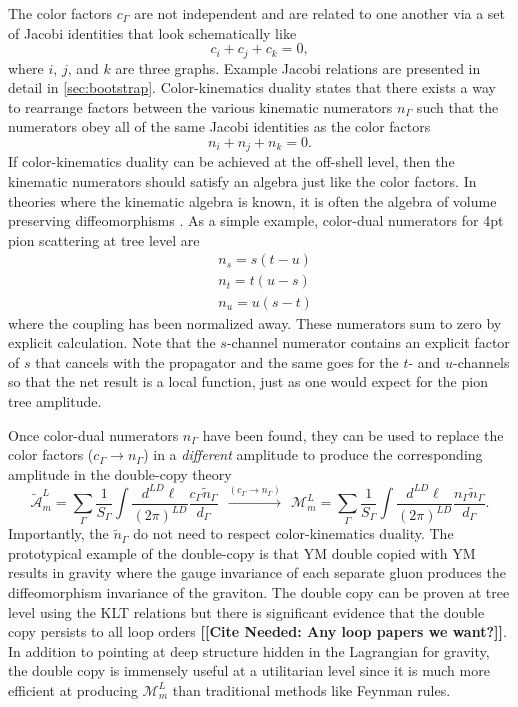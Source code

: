 \documentclass[11pt,letter]{article}
\def\be{\begin{equation}}
\newcommand{\citepls}[1]{{\bf\color{red}[[Cite Needed: #1]]}}
\begin{document}
The color factors $c_\Gamma$ are not independent and are related to
one another via a set of Jacobi identities that look schematically
like
\begin{equation}
c_i+c_j+c_k=0,
\end{equation}
where $i$, $j$, and $k$ are three graphs.  Example Jacobi relations
are presented in detail in \cref{sec:bootstrap}.  Color-kinematics
duality states that there exists a way to rearrange factors between
the various kinematic numerators $n_\Gamma$ such that the numerators
obey all of the same Jacobi identities as the color factors
\begin{equation}
n_i +n_j +n_k=0.
\end{equation}
If color-kinematics duality can be achieved at the off-shell level,
then the kinematic numerators should satisfy an algebra just like the
color factors.  In theories where the kinematic algebra is known, it
is often the algebra of volume preserving diffeomorphisms
\cite{Monteiro2011pc, Ben-Shahar:2021zww, Cheung:2020djz,
  Cheung:2021zvb, Cheung:2022mix}.  As a simple example, color-dual
numerators for 4pt pion scattering at tree level are
\begin{align}
&n_s = s(t-u)\\
&n_t = t(u-s)\\
&n_u = u(s-t)
\end{align}
where the coupling has been normalized away.  These numerators sum to
zero by explicit calculation.  Note that the $s$-channel numerator
contains an explicit factor of $s$ that cancels with the propagator
and the same goes for the $t$- and $u$-channels so that the net result
is a local function, just as one would expect for the pion tree
amplitude.

Once color-dual numerators $n_\Gamma$ have been found, they can be
used to replace the color factors ($c_\Gamma \to n_\Gamma$) in a
\emph{different} amplitude to produce the corresponding amplitude in
the double-copy theory \be\label{DCconstruction}
\tilde{\mathcal{A}}_m^L = \sum \limits_\Gamma \frac{1}{S_\Gamma} \int
\frac{d^{LD}\ell}{(2\pi)^{LD}} \frac{c_\Gamma
  \tilde{n}_\Gamma}{d_\Gamma} ~~ \xrightarrow{(c_\Gamma \to n_\Gamma)}
~~ \mathcal{M}_m^L = \sum \limits_\Gamma \frac{1}{S_\Gamma} \int
\frac{d^{LD}\ell}{(2\pi)^{LD}} \frac{n_\Gamma
  \tilde{n}_\Gamma}{d_\Gamma}.
\end{equation}
Importantly, the $\tilde{n}_\Gamma$ do not need to respect
color-kinematics duality.  The prototypical example of the double-copy
is that YM double copied with YM results in gravity where the gauge
invariance of each separate gluon produces the diffeomorphism
invariance of the graviton.  The double copy can be proven at tree
level using the KLT relations but there is significant evidence that
the double copy persists to all loop orders \cite{KLT, KiermaierTalk}
\citepls{Any loop papers we want?}.  In addition to pointing at deep
structure hidden in the Lagrangian for gravity, the double copy is
immensely useful at a utilitarian level since it is much more
efficient at producing $\mathcal{M}_m^L$ than traditional methods like
Feynman rules.
\end{document}
